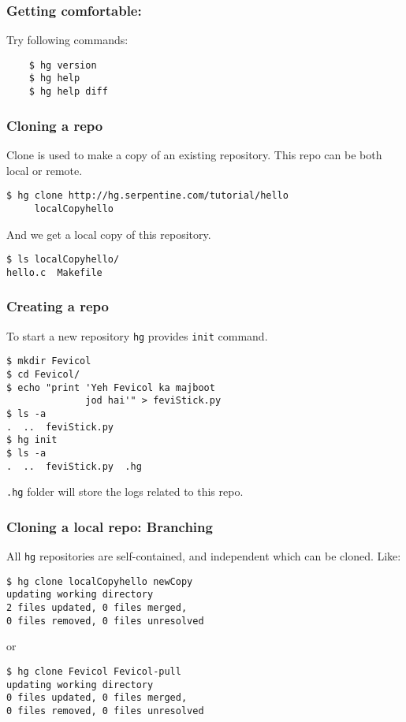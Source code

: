 \documentclass[14pt,compress]{beamer}
\newcommand{\typ}[1]{\lstinline{#1}}
\begin{document}
\begin{frame}[fragile]
  \frametitle{Getting comfortable:}
  Try following commands:
  \begin{lstlisting}
    $ hg version    
    $ hg help
    $ hg help diff
  \end{lstlisting} %
\end{frame}

\begin{frame}[fragile]
  \frametitle{Cloning a repo}
  Clone is used to make a copy of an existing repository. This repo can be both local or remote.
  \begin{lstlisting}
$ hg clone http://hg.serpentine.com/tutorial/hello 
     localCopyhello
  \end{lstlisting}
  And we get a local copy of this repository. 
  \begin{lstlisting}
$ ls localCopyhello/
hello.c  Makefile
  \end{lstlisting}
\end{frame}

\begin{frame}[fragile]
  \frametitle{Creating a repo}
  To start a new repository \typ{hg} provides \typ{init} command.
  \begin{lstlisting}
$ mkdir Fevicol
$ cd Fevicol/
$ echo "print 'Yeh Fevicol ka majboot 
              jod hai'" > feviStick.py
$ ls -a
.  ..  feviStick.py
$ hg init
$ ls -a
.  ..  feviStick.py  .hg
  \end{lstlisting}
\typ{.hg} folder will store the logs related to this repo.
\end{frame}

\begin{frame}[fragile]
  \frametitle{Cloning a local repo: Branching}
  All \typ{hg} repositories are self-contained, and independent which can be cloned. Like:
  \begin{lstlisting}
$ hg clone localCopyhello newCopy
updating working directory
2 files updated, 0 files merged, 
0 files removed, 0 files unresolved
  \end{lstlisting}
or
  \begin{lstlisting}
$ hg clone Fevicol Fevicol-pull
updating working directory
0 files updated, 0 files merged, 
0 files removed, 0 files unresolved
  \end{lstlisting}
\end{frame}
\end{document}
